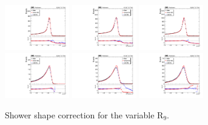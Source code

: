\begin{figure}[htb]
	\centering
	\includegraphics[width=0.25\textwidth]{fig/ss_corr/phoR9_16_EB_Z.pdf}
	\includegraphics[width=0.25\textwidth]{fig/ss_corr/ph_full5x5x_r9_17_EB_Z.pdf}
	\includegraphics[width=0.25\textwidth]{fig/ss_corr/phoR9_18_EB_Z.pdf}\\
	\includegraphics[width=0.25\textwidth]{fig/ss_corr/phoR9_16_EE_Z.pdf}
	\includegraphics[width=0.25\textwidth]{fig/ss_corr/ph_full5x5x_r9_17_EE_Z.pdf}
	\includegraphics[width=0.25\textwidth]{fig/ss_corr/phoR9_18_EE_Z.pdf}\\	
	\label{fig:r9_Z}
	\caption{Shower shape correction for the variable $\mathrm{R}_{9}$.}
\end{figure}
